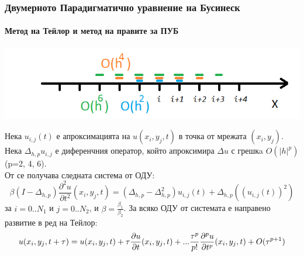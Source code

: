 \documentclass{beamer}
\begin{document}
\begin{frame}
\frametitle{Двумерното Парадигматично уравнение на Бусинеск}
\framesubtitle{Метод на Тейлор и метод на правите за ПУБ}
\begin{center}\vspace{0.25cm}
	\begin{minipage}[b]{0.45\linewidth}
		 \includegraphics[width=\linewidth]{../amitans/figures/FDS.png}
	\end{minipage}	
\end{center}
Нека $u_{i,j}(t)$ е апроксимацията на $u(x_i, y_j, t)$ в точка от мрежата $(x_i, y_j)$.
\\
Нека $\Delta_{h,p} u_{i,j}$ е диференчния оператор, който апроксимира $\Delta u$ с грешкa $O(|h|^p)$ (p=2, 4, 6).
\\
От  се получава следната система от ОДУ:
\begin{equation}\label{DiscreteEq}
\beta (I-\Delta_{h,p}) \frac{\partial^2 u}{\partial t^2}(x_i, y_j, t)=
 (\Delta_{h,p} - \Delta_{h,p}^2) u_{i, j}(t) + \Delta_{h,p} ( ( u_{i, j}(t) )^2 )
\end{equation}
за $i = 0..N_1$ и $j=0..N_2$, и $\beta = \frac{\beta_1}{\beta_2}$. За всяко ОДУ от системата е направено развитие в ред на Тейлор:
\begin{align} \label{TSe}
\small
u(x_i, y_j, t+\tau) = u(x_i, y_j, t) + \tau \frac{ \partial u }{ \partial t }(x_i, y_j, t)  + ... 
\frac{ \tau^p }{ p! } \frac{ \partial^p u }{ \partial t^p }(x_i, y_j, t) + O(\tau^{p+1})
\end{align}

\end{frame}

\end{document}
